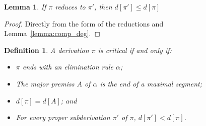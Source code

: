 \documentclass{article}
\newtheorem{definition}{Definition}[section]
\newtheorem{lemma}{Lemma}
\begin{document}
\begin{lemma}\label{lemma:reduction}
  If $\pi$ reduces to $\pi'$, then $d[\pi']\leq d[\pi]$
\end{lemma}
\begin{proof}
  Directly from the form of the reductions and Lemma~\ref{lemma:comp_deg}.
\end{proof}

\begin{definition}
  A derivation $\pi$ is \emph{critical} if and only if:
  \begin{itemize}
  \item $\pi$ ends with an elimination rule $\alpha$;
  \item The major premiss $A$ of $\alpha$ is the end of a maximal segment;
  \item $d[\pi]=d[A]$; and
  \item For every proper subderivation $\pi'$ of $\pi$, $d[\pi']<d[\pi]$.
  \end{itemize}
\end{definition}
\end{document}
